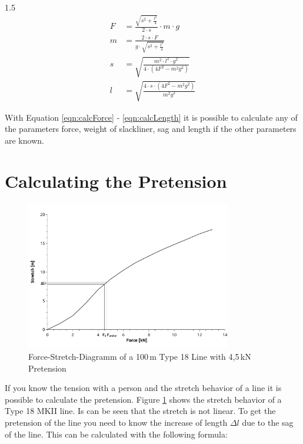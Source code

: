 \begin{spreadlines}{1.5\baselineskip}
\begin{align}
	F &= \frac{\sqrt{s^2 + \frac{l^2}{4}}}{2\cdot s} \cdot m\cdot g \label{eqn:calcForce} \\
	m &= \frac{2\cdot s\cdot F}{g\cdot\sqrt{s^2 + \frac{l^2}{4}}} \label{eqn:calcWeight} \\
	s &= \sqrt{ \frac{m^2\cdot l^2\cdot g^2}{4\cdot(4F^2 - m^2g^2)} } \label{eqn:calSag} \\
	l &= \sqrt{ \frac{4\cdot s\cdot (4F^2 - m^2g^2)}{m^2g^2} } \label{eqn:calcLength} 
\end{align}
\end{spreadlines}

With Equation \ref{eqn:calcForce} - \ref{eqn:calcLength} it is possible to calculate any of the parameters force, weight of slackliner, sag and length if the other parameters are known.

\section{Calculating the Pretension}

\begin{figure}[htb] \centering
	\includegraphics[width=0.8\textwidth]{images/forceStretchDiagram.pdf}
	\caption{Force-Stretch-Diagramm of a 100\,m Type 18 Line with 4,5\,kN Pretension}
	\label{fig:forceStretchDiagramm}
\end{figure}

If you know the tension with a person and the stretch behavior of a line it is possible to calculate the pretension. Figure \ref{fig:forceStretchDiagramm} shows the stretch behavior of a Type 18 MKII line. Is can be seen that the stretch is not linear. To get the pretension of the line you need to know the increase of length $\Delta l$ due to the sag of the line. This can be calculated with the following formula:

